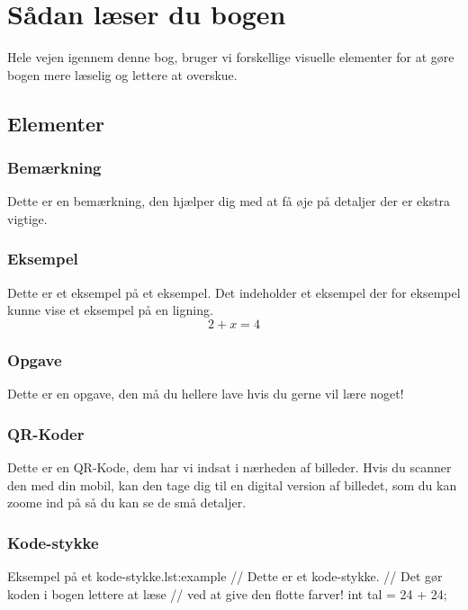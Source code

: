 \cleardoublepage
\chapter{Sådan læser du bogen}
Hele vejen igennem denne bog, bruger vi forskellige visuelle elementer for at gøre bogen mere læselig og lettere at overskue.

\section{Elementer}

\subsection{Bemærkning}
\begin{remark}
	Dette er en bemærkning, den hjælper dig med at få øje på detaljer der er ekstra vigtige.
\end{remark}

\subsection{Eksempel}
\begin{example}
	Dette er et eksempel på et eksempel. Det indeholder et eksempel der for eksempel kunne vise et eksempel på en ligning. 
	$$2+x=4$$
\end{example}

\subsection{Opgave}
\begin{exercise}
	Dette er en opgave, den må du hellere lave hvis du gerne vil lære noget!
\end{exercise}

\subsection{QR-Koder}
Dette er en QR-Kode, dem har vi indsat i nærheden af billeder. Hvis du scanner den med din mobil, kan den tage dig til en digital version af billedet, som du kan zoome ind på så du kan se de små detaljer.


\subsection{Kode-stykke}

\begin{JavaCodeH}{Eksempel på et kode-stykke.}{lst:example}
	// Dette er et kode-stykke.
	// Det gør koden i bogen lettere at læse 
	// ved at give den flotte farver!
	int tal = 24 + 24;
\end{JavaCodeH}